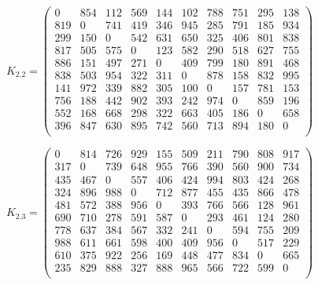 \begin{equation}
	\label{eq:kd2.2}
	K_{2.2} = \begin{pmatrix}
		0 & 854 & 112 & 569 & 144 & 102 & 788 & 751 & 295 & 138 \\
		819 & 0 & 741 & 419 & 346 & 945 & 285 & 791 & 185 & 934 \\
		299 & 150 & 0 & 542 & 631 & 650 & 325 & 406 & 801 & 838 \\
		817 & 505 & 575 & 0 & 123 & 582 & 290 & 518 & 627 & 755 \\
		886 & 151 & 497 & 271 & 0 & 409 & 799 & 180 & 891 & 468 \\
		838 & 503 & 954 & 322 & 311 & 0 & 878 & 158 & 832 & 995 \\
		141 & 972 & 339 & 882 & 305 & 100 & 0 & 157 & 781 & 153 \\
		756 & 188 & 442 & 902 & 393 & 242 & 974 & 0 & 859 & 196 \\
		552 & 168 & 668 & 298 & 322 & 663 & 405 & 186 & 0 & 658 \\
		396 & 847 & 630 & 895 & 742 & 560 & 713 & 894 & 180 & 0 \\
	\end{pmatrix}
\end{equation}

\begin{equation}
	\label{eq:kd2.3}
	K_{2.3} = \begin{pmatrix}
		0 & 814 & 726 & 929 & 155 & 509 & 211 & 790 & 808 & 917 \\
		317 & 0 & 739 & 648 & 955 & 766 & 390 & 560 & 900 & 734 \\
		435 & 467 & 0 & 557 & 406 & 424 & 994 & 803 & 424 & 268 \\
		324 & 896 & 988 & 0 & 712 & 877 & 455 & 435 & 866 & 478 \\
		481 & 572 & 388 & 956 & 0 & 393 & 766 & 566 & 128 & 961 \\
		690 & 710 & 278 & 591 & 587 & 0 & 293 & 461 & 124 & 280 \\
		778 & 637 & 384 & 567 & 332 & 241 & 0 & 594 & 755 & 209 \\
		988 & 611 & 661 & 598 & 400 & 409 & 956 & 0 & 517 & 229 \\
		610 & 375 & 922 & 256 & 169 & 448 & 477 & 834 & 0 & 665 \\
		235 & 829 & 888 & 327 & 888 & 965 & 566 & 722 & 599 & 0 \\
	\end{pmatrix}
\end{equation}


